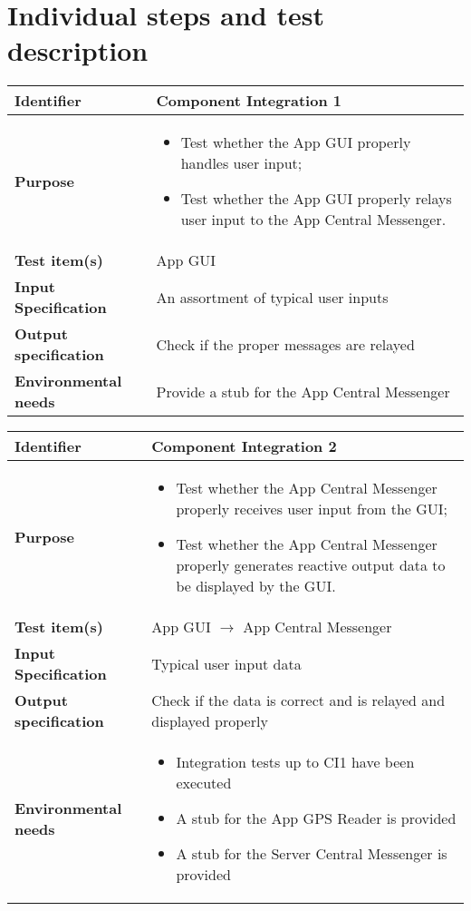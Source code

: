 \chapter{Individual steps and test description}


\begin{center}
\begin{tabular}{lp{}}
\toprule
\textbf{Identifier}		&	Component Integration 1\\
\midrule
\textbf{Purpose}		&	\begin{itemize}
					\item Test whether the App GUI properly handles user input;
					\item Test whether the App GUI properly relays user input to the App Central Messenger.
					\end{itemize}	\\
\textbf{Test item(s)}	&	App GUI\\
\textbf{Input Specification}	&	An assortment of typical user inputs\\
\textbf{Output specification}	&	Check if the proper messages are relayed\\
\textbf{Environmental needs}	&	Provide a stub for the App Central Messenger\\
\bottomrule
\end{tabular}
\end{center}


\begin{center}
\begin{tabular}{lp{}}
\toprule
\textbf{Identifier}		&	Component Integration 2\\
\midrule
\textbf{Purpose}		&	\begin{itemize}
					\item Test whether the App Central Messenger properly receives user input from the GUI;
					\item Test whether the App Central Messenger properly generates reactive output data to be displayed by the GUI.
					\end{itemize}	\\
\textbf{Test item(s)}	&	App GUI $\rightarrow$ App Central Messenger\\
					
\textbf{Input Specification}	&	Typical user input data\\
\textbf{Output specification}	&	Check if the data is correct and is relayed and displayed properly\\
\textbf{Environmental needs}	&	\begin{itemize}
							\item Integration tests up to CI1 have been executed
							\item A stub for the App GPS Reader is provided
							\item A stub for the Server Central Messenger is provided
							\end{itemize}	\\
\bottomrule
\end{tabular}
\end{center}

